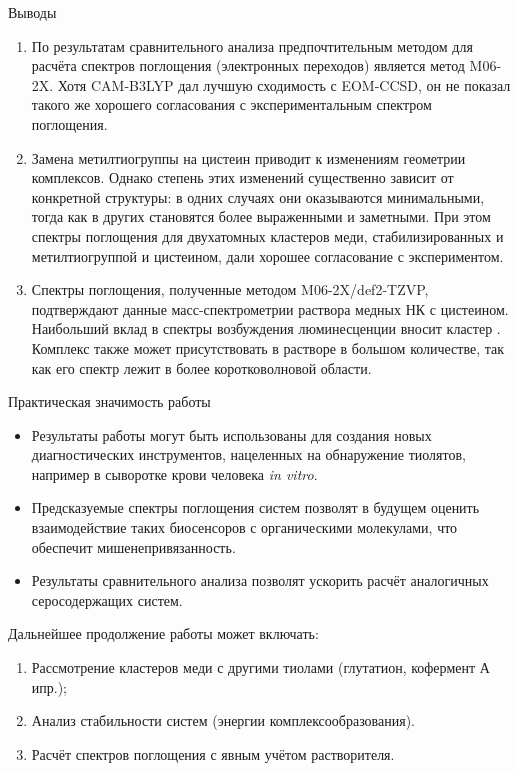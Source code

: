 \documentclass[10pt, aspectratio=169]{beamer}
\newcommand{\ths}{\thinspace}
\begin{document}
\begin{frame}{Выводы}
	\begin{enumerate}
		\item По результатам сравнительного анализа предпочтительным методом для расчёта спектров поглощения (электронных переходов) является метод M06-2X. Хотя CAM-B3LYP дал лучшую сходимость с EOM-CCSD, он не показал такого же хорошего согласования с экспериментальным спектром поглощения.
		\item Замена метилтиогруппы на цистеин приводит к изменениям геометрии комплексов. Однако степень этих изменений существенно зависит от конкретной структуры: в одних случаях они оказываются минимальными, тогда как в других становятся более выраженными и заметными. При этом спектры поглощения для двухатомных кластеров меди, стабилизированных и метилтиогруппой и цистеином, дали хорошее согласование с экспериментом. 
		\item Спектры поглощения, полученные методом M06-2X/def2-TZVP, подтверждают данные масс-спектрометрии раствора медных НК с цистеином. Наибольший вклад в спектры возбуждения люминесценции вносит кластер . Комплекс  также может присутствовать в растворе в большом количестве, так как его спектр лежит в более коротковолновой области.
	\end{enumerate}
\end{frame}

\begin{frame}{Практическая значимость работы}
	\begin{itemize}
		\item Результаты работы могут быть использованы для создания новых диагностических инструментов, нацеленных на обнаружение тиолятов, например в сыворотке крови человека \textit{in vitro}. 
		\item Предсказуемые спектры поглощения систем позволят в будущем оценить взаимодействие таких биосенсоров с органическими молекулами, что обеспечит мишенепривязанность.
		\item Результаты сравнительного анализа позволят ускорить расчёт аналогичных серосодержащих систем.
	\end{itemize}
	
	\vfill
	Дальнейшее продолжение работы может включать: 
	\begin{enumerate}
		\item Рассмотрение кластеров меди с другими тиолами (глутатион, кофермент А и\ths пр.);
		\item Анализ стабильности систем (энергии комплексообразования). 
		\item Расчёт спектров поглощения с явным учётом растворителя. %
	\end{enumerate}	
	
\end{frame}
\end{document}
